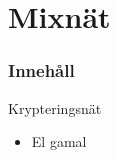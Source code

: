 \section{Mixnät}
\begin{frame}
\frametitle{Innehåll}
\tableofcontents[currentsection]
\end{frame}

\begin{frame}{Krypteringsnät}


\begin{center}
\end{center}

\begin{itemize}
\item El gamal
\end{itemize}

\end{frame}

